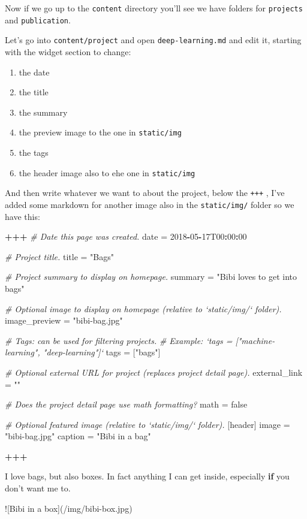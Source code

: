 \documentclass[12pt,]{book}
\newenvironment{Shaded}{\begin{snugshade}}{\end{snugshade}}
\newcommand{\DecValTok}[1]{\textcolor[rgb]{0.00,0.00,0.81}{#1}}
\newcommand{\StringTok}[1]{\textcolor[rgb]{0.31,0.60,0.02}{#1}}
\newcommand{\CommentTok}[1]{\textcolor[rgb]{0.56,0.35,0.01}{\textit{#1}}}
\newcommand{\ControlFlowTok}[1]{\textcolor[rgb]{0.13,0.29,0.53}{\textbf{#1}}}
\newcommand{\OperatorTok}[1]{\textcolor[rgb]{0.81,0.36,0.00}{\textbf{#1}}}
\newcommand{\NormalTok}[1]{#1}
\providecommand{\tightlist}{%
  \setlength{\itemsep}{0pt}\setlength{\parskip}{0pt}}
\theoremstyle{definition}
\theoremstyle{definition}
\theoremstyle{definition}
\theoremstyle{remark}
\begin{document}
Now if we go up to the \texttt{content} directory you'll see we have
folders for \texttt{projects} and \texttt{publication}.

Let's go into \texttt{content/project} and open
\texttt{deep-learning.md} and edit it, starting with the widget section
to change:

\begin{enumerate}
\def\labelenumi{\arabic{enumi}.}
\tightlist
\item
  the date
\item
  the title
\item
  the summary
\item
  the preview image to the one in \texttt{static/img}
\item
  the tags
\item
  the header image also to ehe one in \texttt{static/img}
\end{enumerate}

And then write whatever we want to about the project, below the
\texttt{+++} , I've added some markdown for another image also in the
\texttt{static/img/} folder so we have this:

\begin{Shaded}
\begin{Highlighting}[]
 \OperatorTok{+++}
\CommentTok{# Date this page was created.}
\NormalTok{date =}\StringTok{ }\DecValTok{2018}\OperatorTok{-}\DecValTok{05}\OperatorTok{-}\NormalTok{17T00}\OperatorTok{:}\DecValTok{00}\OperatorTok{:}\DecValTok{00}

\CommentTok{# Project title.}
\NormalTok{title =}\StringTok{ "Bags"}

\CommentTok{# Project summary to display on homepage.}
\NormalTok{summary =}\StringTok{ "Bibi loves to get into bags"}

\CommentTok{# Optional image to display on homepage (relative to `static/img/` folder).}
\NormalTok{image_preview =}\StringTok{ "bibi-bag.jpg"}

\CommentTok{# Tags: can be used for filtering projects.}
\CommentTok{# Example: `tags = ["machine-learning", "deep-learning"]`}
\NormalTok{tags =}\StringTok{ }\NormalTok{[}\StringTok{"bags"}\NormalTok{]}

\CommentTok{# Optional external URL for project (replaces project detail page).}
\NormalTok{external_link =}\StringTok{ ""}

\CommentTok{# Does the project detail page use math formatting?}
\NormalTok{math =}\StringTok{ }\NormalTok{false}

\CommentTok{# Optional featured image (relative to `static/img/` folder).}
\NormalTok{[header]}
\NormalTok{image =}\StringTok{ "bibi-bag.jpg"}
\NormalTok{caption =}\StringTok{ "Bibi in a bag"}

\OperatorTok{+++}

\NormalTok{I love bags, but also boxes. In fact anything I can get inside, especially}
\ControlFlowTok{if}\NormalTok{ you don}\StringTok{'t want me to.}

\StringTok{![Bibi in a box](/img/bibi-box.jpg)}
\end{Highlighting}
\end{Shaded}
\end{document}
